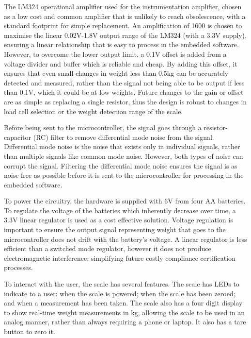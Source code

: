 The LM324 operational amplifier used for the instrumentation amplifier, chosen as a low cost and common amplifier that is unlikely to reach obsolescence, with a standard footprint for simple replacement. An amplification of 1600 is chosen to maximise the linear 0.02V-1.8V output range of the LM324 (with a 3.3V supply), ensuring a linear relationship that is easy to process in the embedded software. However, to overcome the lower output limit, a 0.1V offset is added from a voltage divider and buffer which is reliable and cheap. By adding this offset, it ensures that even small changes in weight less than 0.5kg can be accurately detected and measured, rather than the signal not being able to be output if less than 0.1V, which it could be at low weights. Future changes to the gain or offset are as simple as replacing a single resistor, thus the design is robust to changes in load cell selection or the weight detection range of the scale.

Before being sent to the microcontroller, the signal goes through a resistor-capacitor (RC) filter to remove differential mode noise from the signal. Differential mode noise is the noise that exists only in individual signals, rather than multiple signals like common mode noise. However, both types of noise can corrupt the signal. Filtering the differential mode noise ensures the signal is as noise-free as possible before it is sent to the microcontroller for processing in the embedded software.

To power the circuitry, the hardware is supplied with 6V from four AA batteries. To regulate the voltage of the batteries which inherently decrease over time, a 3.3V linear regulator is used as a cost effective solution. Voltage regulation is important to ensure the output signal representing weight that goes to the microcontroller does not drift with the battery’s voltage. A linear regulator is less efficient than a switched mode regulator, however it does not produce electromagnetic interference; simplifying future costly compliance certification processes.

To interact with the user, the scale has several features. The scale has LEDs to indicate to a user: when the scale is powered; when the scale has been zeroed; and when a measurement has been taken. The scale also has a four digit display to show real-time weight measurements in kg, allowing the scale to be used in an analog manner, rather than always requiring a phone or laptop. It also has a tare button to zero it.

